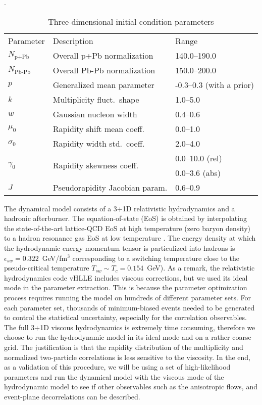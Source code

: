 \begin{table}
\centering
\caption{Three-dimensional initial condition parameters}
\label{tab:trento:parameters}.
\begin{tabular}{lll}
      Parameter & Description	& Range \\
      \paddedhline
      $N_{\textrm{p+Pb}}$    & Overall p+Pb normalization      & 140.0--190.0 \\
      $N_{\textrm{Pb-Pb}}$   & Overall Pb-Pb normalization     & 150.0--200.0  \\
      $p$	                   & Generalized mean parameter      & -0.3--0.3 (with a prior)  \\
      $k$	                   & Multiplicity fluct.\ shape      & 1.0--5.0  \\
      $w$	                   & Gaussian nucleon width     & 0.4--0.6  \\
      $\mu_0$                & Rapidity shift mean coeff.\     & 0.0--1.0  \\
      $\sigma_0$             & Rapidity width std.\ coeff.\    & 2.0--4.0  \\
      \multirow{2}{*}{$\gamma_0$}             & \multirow{2}{*}{Rapidity skewness coeff.\ }      & 0.0--10.0 (rel) \\
                  &        & 0.0--3.6 (abs)  \\
      $J$	                   & Pseudorapidity Jacobian param.  & 0.6--0.9
\end{tabular}  
\end{table}

The dynamical model consists of a 3+1D relativistic hydrodynamics and a hadronic afterburner.
The equation-of-state (EoS) is obtained by interpolating the state-of-the-art lattice-QCD EoS \cite{Bazavov:2014pvz} at high temperature (zero baryon density) to a hadron resonance gas EoS at low temperature \cite{Moreland:2015dvc}.
The energy density at which the hydrodynamic energy momentum tensor is particulized into hadrons is $\epsilon_{sw} = 0.322$~GeV/fm$^3$ corresponding to a switching temperature close to the pseudo-critical temperature $T_{sw} \sim T_c = 0.154$~GeV).
As a remark, the relativistic hydrodynamics code vHLLE \cite{Karpenko:2013wva} includes viscous corrections, but we used its ideal mode in the parameter extraction.
This is because the parameter optimization process requires running the model on hundreds of different parameter sets.
For each parameter set, thousands of minimum-biased events needed to be generated to control the statistical uncertainty, especially for the correlation observables. 
The full 3+1D viscous hydrodynamics is extremely time consuming, therefore we choose to run the hydrodynamic model in its ideal mode and on a rather coarse grid.
The justification is that the rapidity distribution of the multiplicity and normalized two-particle correlations is less sensitive to the viscosity.
In the end, as a validation of this procedure, we will be using a set of high-likelihood parameters and run the dynamical model with the viscous mode of the hydrodynamic model to see if other observables such as the anisotropic flows, and event-plane decorrelations can be described.

